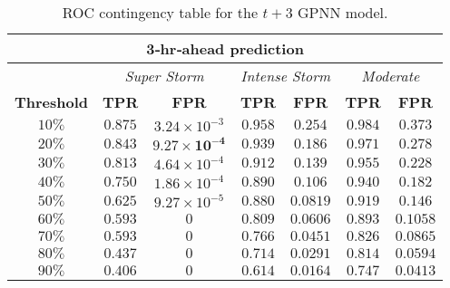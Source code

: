 \begin{table}[ht]
	\centering
	\caption{ROC contingency table for the $t+3$ GPNN model.}
	\label{table:rocgpnn3h}
	\begin{tabular}
		{c| c c | c c | c c}
		\hline
		\multicolumn{7}{c}{\textbf{3‐hr‐ahead prediction}} \\ 
		\hline
		 & \multicolumn{2}{c}{\textit{Super Storm}} & \multicolumn{2}{c}{\textit{Intense Storm}} & \multicolumn{2}{c}{\textit{Moderate}} \\ 
		\hline
		\textbf{Threshold} & \textbf{TPR} & \textbf{FPR} & \textbf{TPR} & \textbf{FPR} & \textbf{TPR} & \textbf{FPR} \\ 
		\hline
		$10\%$ & $0.875$ & $3.24\times10^{-3}$ & $0.958$ & $0.254$ & $0.984$ & $0.373$ \\ 
		$20\%$ & $\mathbf{0.843}$ & $\mathbf{9.27\times10^{-4}}$ & $0.939$ & $0.186$ & $0.971$ & $0.278$ \\ 
		$30\%$ & $0.813$ & $4.64\times10^{-4}$ & $0.912$ & $0.139$ & $0.955$ & $0.228$ \\ 
		$40\%$ & $0.750$ & $1.86\times10^{-4}$ & $\mathbf{0.890}$ & $\mathbf{0.106}$ & $0.940$ & $0.182$ \\ 
		$50\%$ & $0.625$ & $9.27\times10^{-5}$ & $0.880$ & $0.0819$ & $0.919$ & $0.146$ \\ 
		$60\%$ & $0.593$ & $0$ & $0.809$ & $0.0606$ & $\mathbf{0.893}$ & $\mathbf{0.1058}$ \\ 
		$70\%$ & $0.593$ & $0$ & $0.766$ & $0.0451$ & $0.826$ & $0.0865$ \\ 
		$80\%$ & $0.437$ & $0$ & $0.714$ & $0.0291$ & $0.814$ & $0.0594$ \\ 
		$90\%$ & $0.406$ & $0$ & $0.614$ & $0.0164$ & $0.747$ & $0.0413$\\
		\hline
	\end{tabular}
\end{table}


